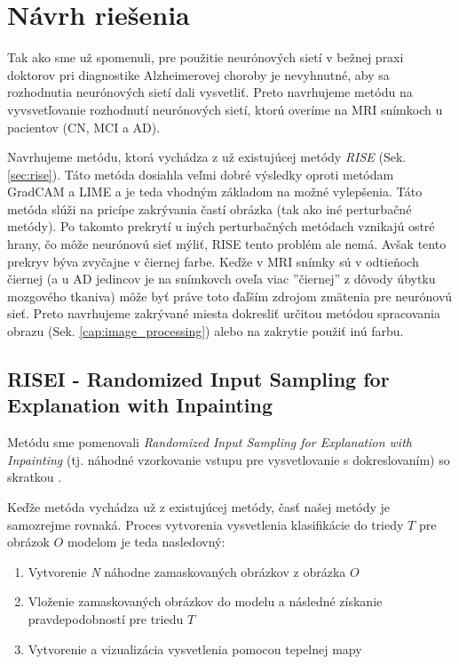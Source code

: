 \chapter{Návrh riešenia}

Tak ako sme už spomenuli, pre použitie neurónových sietí v bežnej praxi doktorov pri diagnostike Alzheimerovej choroby je nevyhnutné, aby sa rozhodnutia neurónových sietí dali vysvetliť. Preto navrhujeme metódu na vyvsvetľovanie rozhodnutí neurónových sietí, ktorú overíme na MRI snímkoch u pacientov (CN, MCI a AD).

Navrhujeme metódu, ktorá vychádza z už existujúcej metódy \textit{RISE} (Sek. \ref{sec:rise}). Táto metóda dosiahla veľmi dobré výsledky oproti metódam GradCAM a LIME a je teda vhodným základom na možné vylepšenia. Táto metóda slúži na pricípe zakrývania častí obrázka (tak ako iné perturbačné metódy). Po takomto prekrytí u iných perturbačných metódach vznikajú ostré hrany, čo môže neurónovú sieť mýliť, RISE tento problém ale nemá. Avšak tento prekryv býva zvyčajne v čiernej farbe. Keďže v MRI snímky sú v odtieňoch čiernej (a u AD jedincov je na snímkovch oveľa viac ''čiernej'' z dôvody úbytku mozgového tkaniva) môže byť práve toto ďaľším zdrojom zmätenia pre neurónovú sieť. Preto navrhujeme zakrývané miesta dokresliť určitou metódou spracovania obrazu (Sek. \ref{cap:image_processing}) alebo na zakrytie použiť inú farbu.

\section{RISEI - Randomized Input Sampling for Explanation with Inpainting}

Metódu sme pomenovali \textit{Randomized Input Sampling for Explanation with Inpainting} (tj. náhodné vzorkovanie vstupu pre vysvetlovanie s dokreslovaním) so skratkou .

Keďže metóda vychádza už z existujúcej metódy, časť našej metódy je samozrejme rovnaká. Proces vytvorenia vysvetlenia klasifikácie do triedy $T$ pre obrázok $O$ modelom je teda nasledovný:

\begin{enumerate}
    \item Vytvorenie \textit{N} náhodne zamaskovaných obrázkov z obrázka $O$
    \item Vloženie zamaskovaných obrázkov do modelu a následné získanie pravdepodobností pre triedu $T$
    \item Vytvorenie a vizualizácia vysvetlenia pomocou tepelnej mapy
\end{enumerate}

